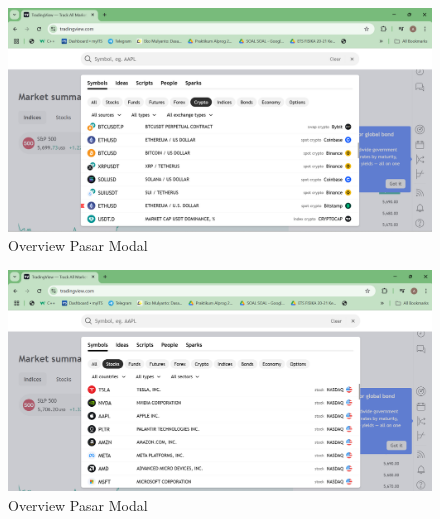 \begin{figure} [H] \centering
  \includegraphics[scale=0.25]{gambar/CRYPTO.png} 
    \caption{Overview Pasar Modal}
    \label{fig:label_gambar}
\end{figure}

\begin{figure} [H] \centering
  \includegraphics[scale=0.4]{gambar/STOCK.png} 
    \caption{Overview Pasar Modal}
    \label{fig:label_gambar}
\end{figure}
